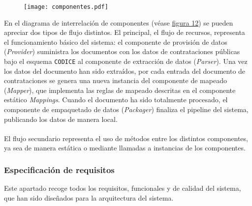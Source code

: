             \vspace{0.3cm}
            
            \begin{figure}[h]
                \centering
                \texttt{[image: componentes.pdf]}
                \label{fig:componentes}
            \end{figure}
            
            En el diagrama de interrelación de componentes (véase \hyperref[fig:componentes]{figura 12}) se pueden apreciar dos tipos de flujo distintos.
\newpage
            El principal, el flujo de recursos, representa el funcionamiento básico del sistema: el componente de provisión de datos (\textit{Provider}) suministra los documentos con los datos de contrataciones públicas bajo el esquema \texttt{CODICE} al componente de extracción de datos (\textit{Parser}). Una vez los datos del documento han sido extraídos, por cada entrada del documento de contrataciones se genera una nueva instancia del componente de mapeado (\textit{Mapper}), que implementa las reglas de mapeado descritas en el componente estático \textit{Mappings}. Cuando el documento ha sido totalmente procesado, el componente de empaquetado de datos (\textit{Packager}) finaliza el pipeline del sistema, publicando los datos de manera local.
            \\ \\
            El flujo secundario representa el uso de métodos entre los distintos componentes, ya sea de manera estática o mediante llamadas a instancias de los componentes.
            
        \subsubsection{Especificación de requisitos}
            Este apartado recoge todos los requisitos, funcionales y de calidad del sistema, que han sido diseñados para la arquitectura del sistema.

